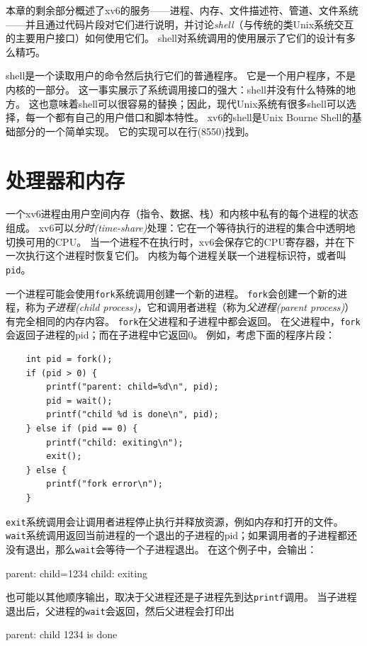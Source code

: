 本章的剩余部分概述了xv6的服务——进程、内存、文件描述符、管道、文件系统——并且通过代码片段对它们进行说明，并讨论\emph{shell}（与传统的类Unix系统交互的主要用户接口）如何使用它们。
shell对系统调用的使用展示了它们的设计有多么精巧。

shell是一个读取用户的命令然后执行它们的普通程序。
它是一个用户程序，不是内核的一部分。
这一事实展示了系统调用接口的强大：shell并没有什么特殊的地方。
这也意味着shell可以很容易的替换；因此，现代Unix系统有很多shell可以选择，每一个都有自己的用户借口和脚本特性。
xv6的shell是Unix Bourne Shell的基础部分的一个简单实现。
它的实现可以在行(8550)找到。

\section{处理器和内存}

一个xv6进程由用户空间内存（指令、数据、栈）和内核中私有的每个进程的状态组成。
xv6可以\emph{分时(time-share)}处理：它在一个等待执行的进程的集合中透明地切换可用的CPU。
当一个进程不在执行时，xv6会保存它的CPU寄存器，并在下一次执行这个进程时恢复它们。
内核为每个进程关联一个进程标识符，或者叫\texttt{pid}。

一个进程可能会使用\texttt{fork}系统调用创建一个新的进程。
\texttt{fork}会创建一个新的进程，称为\emph{子进程(child process)}，它和调用者进程（称为\emph{父进程(parent process)}）有完全相同的内存内容。
\texttt{fork}在父进程和子进程中都会返回。
在父进程中，\texttt{fork}会返回子进程的pid；而在子进程中它返回0。
例如，考虑下面的程序片段：

\begin{lstlisting}
    int pid = fork();
    if (pid > 0) {
        printf("parent: child=%d\n", pid);
        pid = wait();
        printf("child %d is done\n", pid);
    } else if (pid == 0) {
        printf("child: exiting\n");
        exit();
    } else {
        printf("fork error\n");
    }
\end{lstlisting}

\texttt{exit}系统调用会让调用者进程停止执行并释放资源，例如内存和打开的文件。
\texttt{wait}系统调用返回当前进程的一个退出的子进程的pid；如果调用者的子进程都还没有退出，那么\texttt{wait}会等待一个子进程退出。
在这个例子中，会输出：
\begin{blacklisting}
    parent: child=1234
    child: exiting
\end{blacklisting}    

也可能以其他顺序输出，取决于父进程还是子进程先到达\texttt{printf}调用。
当子进程退出后，父进程的\texttt{wait}会返回，然后父进程会打印出
\begin{blacklisting}
    parent: child 1234 is done
\end{blacklisting}

